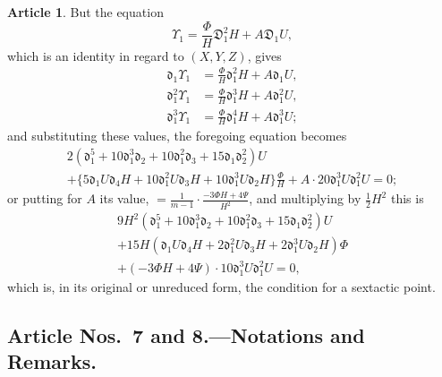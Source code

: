 \documentclass[12pt,a4paper]{article}
\theoremstyle{definition}
\newtheorem{art}{Article}[section]
\begin{document}
\begin{art}
But the equation
\[
\Upsilon_1 = \frac{\Phi}{H} \mathfrak{D}_1^2 H + A \mathfrak{D}_1 U,
\]
which is an identity in regard to $(X, Y, Z)$, gives
\begin{align*}
\mathfrak{d}_1 \Upsilon_1 &= \frac{\Phi}{H} \mathfrak{d}_1^2 H + A \mathfrak{d}_1 U, \\
\mathfrak{d}_1^2 \Upsilon_1 &= \frac{\Phi}{H} \mathfrak{d}_1^3 H + A \mathfrak{d}_1^2 U, \\
\mathfrak{d}_1^3 \Upsilon_1 &= \frac{\Phi}{H} \mathfrak{d}_1^4 H + A \mathfrak{d}_1^3 U;
\end{align*}
and substituting these values, the foregoing equation becomes
\begin{multline*}
2(\mathfrak{d}_1^5 + 10\mathfrak{d}_1^3\mathfrak{d}_2 + 10\mathfrak{d}_1^2\mathfrak{d}_3 + 15\mathfrak{d}_1\mathfrak{d}_2^2)U \\
+ \{5\mathfrak{d}_1 U \mathfrak{d}_4 H + 10\mathfrak{d}_1^2 U \mathfrak{d}_3 H + 10\mathfrak{d}_1^3 U \mathfrak{d}_2 H\}\frac{\Phi}{H} + A \cdot 20\mathfrak{d}_1^3 U \mathfrak{d}_1^2 U = 0;
\end{multline*}
or putting for $A$ its value, $= \frac{1}{m - 1} \cdot \frac{-3\Phi H + 4\Psi}{H^2}$, and multiplying by $\frac{1}{2}H^2$ this is
\begin{multline*}
9H^2(\mathfrak{d}_1^5 + 10\mathfrak{d}_1^3\mathfrak{d}_2 + 10\mathfrak{d}_1^2\mathfrak{d}_3 + 15\mathfrak{d}_1\mathfrak{d}_2^2)U \\
+ 15H(\mathfrak{d}_1 U \mathfrak{d}_4 H + 2\mathfrak{d}_1^2 U \mathfrak{d}_3 H + 2\mathfrak{d}_1^3 U \mathfrak{d}_2 H)\Phi \\
+ (-3\Phi H + 4\Psi) \cdot 10\mathfrak{d}_1^3 U \mathfrak{d}_1^2 U = 0,
\end{multline*}
which is, in its original or unreduced form, the condition for a sextactic point.
\end{art}

\subsection*{Article Nos.\ 7 and 8.---Notations and Remarks.}
\end{document}
